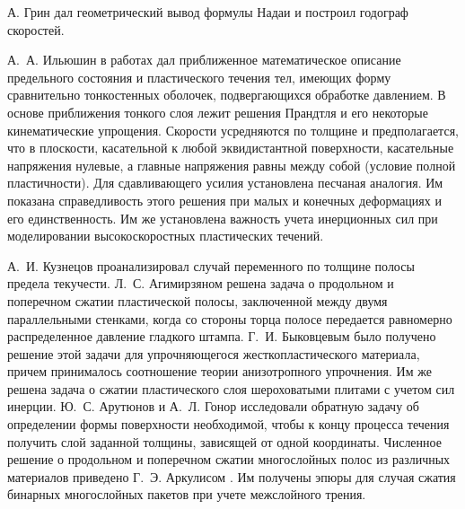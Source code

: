 А. Грин \autocite{Green:1954} дал геометрический вывод формулы Надаи и построил годограф скоростей.

А.~А. Ильюшин в работах \autocite{Ilyushin:1954,Ilyushin:1955} дал приближенное математическое описание предельного состояния и пластического течения тел, имеющих форму сравнительно тонкостенных оболочек, подвергающихся обработке давлением. В основе приближения тонкого слоя лежит решения Прандтля и его некоторые кинематические упрощения. Скорости усредняются по толщине и предполагается, что в плоскости, касательной к любой эквидистантной поверхности, касательные напряжения нулевые, а главные напряжения равны между собой (условие полной пластичности). Для сдавливающего усилия установлена песчаная аналогия. Им показана справедливость этого решения при малых и конечных деформациях и его единственность. Им же \autocite{Ilyushin:2009} установлена важность учета инерционных сил при моделировании высокоскоростных пластических течений.

А.~И. Кузнецов \autocite{Kuznetsov:1960} проанализировал случай переменного по толщине полосы предела текучести.
Л.~С. Агимирзяном \autocite{Agamirzyan:1962} решена задача о продольном и поперечном сжатии пластической полосы, заключенной между двумя параллельными стенками, когда со стороны торца полосе передается равномерно распределенное давление гладкого штампа.
Г.~И. Быковцевым \autocite{Bikovcev:1964} было получено решение этой задачи для упрочняющегося жесткопластического материала, причем принималось соотношение теории анизотропного упрочнения. Им же \autocite{Bikovcev:1960} решена задача о сжатии пластического слоя шероховатыми плитами с учетом сил инерции.
Ю.~С. Арутюнов и А.~Л. Гонор \autocite{Arutyunov:1963} исследовали обратную задачу об определении формы поверхности необходимой, чтобы к концу процесса течения получить слой заданной толщины, зависящей от одной координаты.
Численное решение о продольном и поперечном сжатии многослойных полос из различных материалов приведено Г.~Э. Аркулисом \autocite{Arkulis:1964}. Им получены эпюры для случая сжатия бинарных многослойных пакетов при учете межслойного трения.

